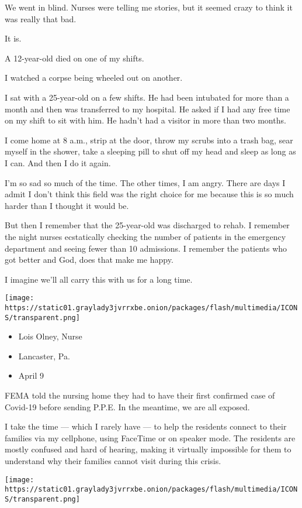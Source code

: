 We went in blind. Nurses were telling me stories, but it seemed crazy to
think it was really that bad.

It is.

A 12-year-old died on one of my shifts.

I watched a corpse being wheeled out on another.

I sat with a 25-year-old on a few shifts. He had been intubated for more
than a month and then was transferred to my hospital. He asked if I had
any free time on my shift to sit with him. He hadn't had a visitor in
more than two months.

I come home at 8 a.m., strip at the door, throw my scrubs into a trash
bag, sear myself in the shower, take a sleeping pill to shut off my head
and sleep as long as I can. And then I do it again.

I'm so sad so much of the time. The other times, I am angry. There are
days I admit I don't think this field was the right choice for me
because this is so much harder than I thought it would be.

But then I remember that the 25-year-old was discharged to rehab. I
remember the night nurses ecstatically checking the number of patients
in the emergency department and seeing fewer than 10 admissions. I
remember the patients who got better and God, does that make me happy.

I imagine we'll all carry this with us for a long time.

\texttt{[image: https://static01.graylady3jvrrxbe.onion/packages/flash/multimedia/ICONS/transparent.png]}

\begin{itemize}
\tightlist
\item
  Lois Olney, Nurse
\item
  Lancaster, Pa.
\item
  April 9
\end{itemize}

FEMA told the nursing home they had to have their first confirmed case
of Covid-19 before sending P.P.E. In the meantime, we are all exposed.

I take the time --- which I rarely have --- to help the residents
connect to their families via my cellphone, using FaceTime or on speaker
mode. The residents are mostly confused and hard of hearing, making it
virtually impossible for them to understand why their families cannot
visit during this crisis.

\texttt{[image: https://static01.graylady3jvrrxbe.onion/packages/flash/multimedia/ICONS/transparent.png]}

